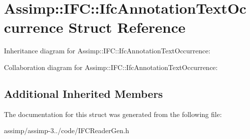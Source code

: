 \hypertarget{struct_assimp_1_1_i_f_c_1_1_ifc_annotation_text_occurrence}{\section{Assimp\+:\+:I\+F\+C\+:\+:Ifc\+Annotation\+Text\+Occurrence Struct Reference}
\label{struct_assimp_1_1_i_f_c_1_1_ifc_annotation_text_occurrence}
}


Inheritance diagram for Assimp\+:\+:I\+F\+C\+:\+:Ifc\+Annotation\+Text\+Occurrence\+:


Collaboration diagram for Assimp\+:\+:I\+F\+C\+:\+:Ifc\+Annotation\+Text\+Occurrence\+:
\subsection*{Additional Inherited Members}


The documentation for this struct was generated from the following file\+:\begin{DoxyCompactItemize}
\item 
assimp/assimp-\/3../code/I\+F\+C\+Reader\+Gen.\+h\end{DoxyCompactItemize}
